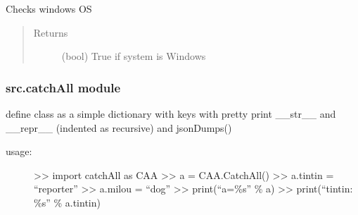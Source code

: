 \documentclass[a4paper,10pt,english]{sphinxmanual}
\begin{document}

\begin{fulllineitems}
\label{\detokenize{apidoc_src/src:src.architecture.is_windows}}
Checks windows OS
\begin{quote}\begin{description}
\item[{Returns}] \leavevmode
(bool) True if system is Windows

\end{description}\end{quote}

\end{fulllineitems}



\subsubsection{src.catchAll module}
\label{\detokenize{apidoc_src/src:module-src.catchAll}}\label{\detokenize{apidoc_src/src:src-catchall-module}}
define class as a simple dictionary with keys
with pretty print \_\_str\_\_ and \_\_repr\_\_ (indented as recursive)
and jsonDumps()
\begin{description}
\item[{usage:}] \leavevmode
\textgreater{}\textgreater{} import catchAll as CAA
\textgreater{}\textgreater{} a = CAA.CatchAll()
\textgreater{}\textgreater{} a.tintin = “reporter”
\textgreater{}\textgreater{} a.milou = “dog”
\textgreater{}\textgreater{} print(“a=\%s” \% a)
\textgreater{}\textgreater{} print(“tintin: \%s” \% a.tintin)

\end{description}
\end{document}
